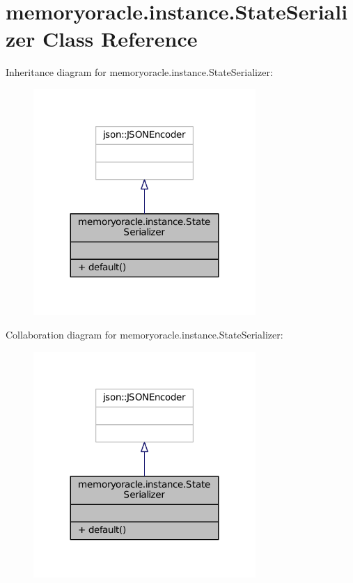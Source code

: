 \hypertarget{classmemoryoracle_1_1instance_1_1StateSerializer}{}\section{memoryoracle.\+instance.\+State\+Serializer Class Reference}
\label{classmemoryoracle_1_1instance_1_1StateSerializer}


Inheritance diagram for memoryoracle.\+instance.\+State\+Serializer\+:\nopagebreak
\begin{figure}[H]
\begin{center}
\leavevmode
\includegraphics[width=239pt]{classmemoryoracle_1_1instance_1_1StateSerializer__inherit__graph}
\end{center}
\end{figure}


Collaboration diagram for memoryoracle.\+instance.\+State\+Serializer\+:\nopagebreak
\begin{figure}[H]
\begin{center}
\leavevmode
\includegraphics[width=239pt]{classmemoryoracle_1_1instance_1_1StateSerializer__coll__graph}
\end{center}
\end{figure}
